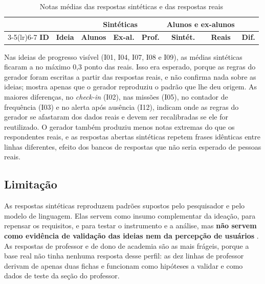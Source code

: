 \begin{table}[H]
  \centering
  \caption{Notas médias das respostas sintéticas e das respostas reais}
  \label{tab:personas-comparacao}
  \footnotesize
  \begin{tabular}{clcccccc}
    \toprule
    & & \multicolumn{3}{c}{\textbf{Sintéticas}} & \multicolumn{2}{c}{\textbf{Alunos e ex-alunos}} & \\
    \cmidrule(lr){3-5}\cmidrule(lr){6-7}
    \textbf{ID} & \textbf{Ideia} & \textbf{Alunos} & \textbf{Ex-al.} & \textbf{Prof.} & \textbf{Sintét.} & \textbf{Reais} & \textbf{Dif.} \\
    \midrule
  \end{tabular}
\end{table}

Nas ideias de progresso visível (I01, I04, I07, I08 e I09), as médias
sintéticas ficaram a no máximo 0,3 ponto das reais. Isso era esperado,
porque as regras do gerador foram escritas a partir das respostas reais, e
não confirma nada sobre as ideias; mostra apenas que o gerador reproduziu
o padrão que lhe deu origem. As maiores diferenças, no \textit{check-in}
(I02), nas missões (I05), no contador de frequência (I03) e no alerta após
ausência (I12), indicam onde as regras do gerador se afastaram dos dados
reais e devem ser recalibradas se ele for reutilizado. O gerador também produziu menos notas extremas do que os respondentes
reais, e as respostas abertas sintéticas repetem frases idênticas entre
linhas diferentes, efeito dos bancos de respostas que não seria esperado
de pessoas reais.

\subsection{Limitação}

As respostas sintéticas reproduzem padrões supostos pelo pesquisador e
pelo modelo de linguagem. Elas servem como insumo complementar da
ideação, para repensar os requisitos, e para testar o instrumento e a
análise, mas \textbf{não servem como evidência de validação das ideias
nem da percepção de usuários}
\cite{argyle2023,aher2023}. As respostas de professor e de dono de
academia são as mais frágeis, porque a base real não tinha nenhuma
resposta desse perfil: as dez linhas de professor derivam de apenas duas
fichas e funcionam como hipóteses a validar e como dados de teste da
seção do professor.

